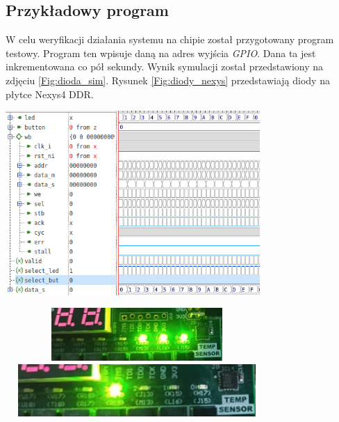 \documentclass[11pt,a4paper]{article}
\begin{document}
	\subsection{Przykładowy program}
	\hspace{5mm} W celu weryfikacji działania systemu na chipie został przygotowany program testowy. Program ten wpisuje daną na adres wyjścia \textit{GPIO}. Dana ta jest inkrementowana co pół sekundy. Wynik symulacji został przedstawiony na zdjęciu \ref{Fig:dioda_sim}. Rysunek \ref{Fig:diody_nexys} przedstawiają diody na płytce Nexys4 DDR.
	\begin{minipage}[c]{\textwidth}
	\begin{center}

					\includegraphics[width=\linewidth,height=7cm]{./rysunki/sim_led.png}
	\end{center}	
	\end{minipage} 	
	
	\begin{minipage}[c]{\textwidth}
	\begin{center}

					\includegraphics[width=10cm,height=2cm]{./rysunki/plytka_2.png}
					\includegraphics[width=10cm,height=2cm]{./rysunki/plytka_3.png}
	\end{center}	
	\end{minipage} 
	
\end{document}
